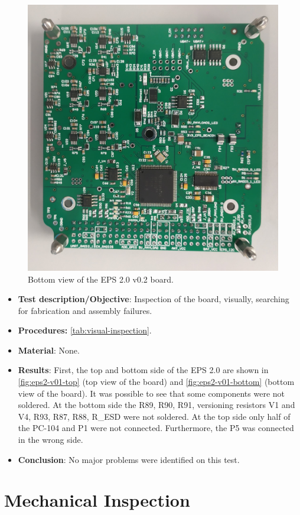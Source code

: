 \begin{figure}[!ht]
    \begin{center}
        \includegraphics[width=0.6\columnwidth]{figures/v02/eps2-v02-bottom.jpg}
        \caption{Bottom view of the EPS 2.0 v0.2 board.}
        \label{fig:eps2-v01-bottom}
    \end{center}
\end{figure}

\begin{itemize}
    \item \textbf{Test description/Objective}: Inspection of the board, visually, searching for fabrication and assembly failures.
    \item \textbf{Procedures:} \autoref{tab:visual-inspection}.
    \item \textbf{Material}: None.
    \item \textbf{Results}: First, the top and bottom side of the EPS 2.0 are shown in \autoref{fig:eps2-v01-top} (top view of the board) and \autoref{fig:eps2-v01-bottom} (bottom view of the board). It was possible to see that some components were not soldered. At the bottom side the R89, R90, R91, versioning resistors V1 and V4, R93, R87, R88, R\_ESD were not soldered. At the top side only half of the PC-104 and P1 were not connected. Furthermore, the P5 was connected in the wrong side.
    \item \textbf{Conclusion}: No major problems were identified on this test.  
\end{itemize}

\newpage

\section{Mechanical Inspection}

